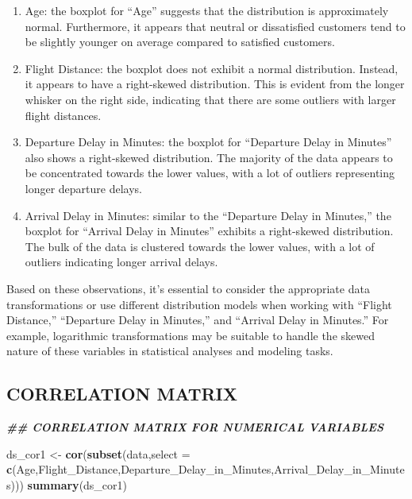 \documentclass[
]{article}
\newenvironment{Shaded}{\begin{snugshade}}{\end{snugshade}}
\newcommand{\AttributeTok}[1]{\textcolor[rgb]{0.13,0.29,0.53}{#1}}
\newcommand{\DocumentationTok}[1]{\textcolor[rgb]{0.56,0.35,0.01}{\textbf{\textit{#1}}}}
\newcommand{\FunctionTok}[1]{\textcolor[rgb]{0.13,0.29,0.53}{\textbf{#1}}}
\newcommand{\NormalTok}[1]{#1}
\newcommand{\OtherTok}[1]{\textcolor[rgb]{0.56,0.35,0.01}{#1}}
\begin{document}
\begin{enumerate}
\def\labelenumi{\arabic{enumi}.}
\item
  Age: the boxplot for ``Age'' suggests that the distribution is
  approximately normal. Furthermore, it appears that neutral or
  dissatisfied customers tend to be slightly younger on average compared
  to satisfied customers.
\item
  Flight Distance: the boxplot does not exhibit a normal distribution.
  Instead, it appears to have a right-skewed distribution. This is
  evident from the longer whisker on the right side, indicating that
  there are some outliers with larger flight distances.
\item
  Departure Delay in Minutes: the boxplot for ``Departure Delay in
  Minutes'' also shows a right-skewed distribution. The majority of the
  data appears to be concentrated towards the lower values, with a lot
  of outliers representing longer departure delays.
\item
  Arrival Delay in Minutes: similar to the ``Departure Delay in
  Minutes,'' the boxplot for ``Arrival Delay in Minutes'' exhibits a
  right-skewed distribution. The bulk of the data is clustered towards
  the lower values, with a lot of outliers indicating longer arrival
  delays.
\end{enumerate}

Based on these observations, it's essential to consider the appropriate
data transformations or use different distribution models when working
with ``Flight Distance,'' ``Departure Delay in Minutes,'' and ``Arrival
Delay in Minutes.'' For example, logarithmic transformations may be
suitable to handle the skewed nature of these variables in statistical
analyses and modeling tasks.

\hypertarget{correlation-matrix}{%
\subsection{CORRELATION MATRIX}\label{correlation-matrix}}

\begin{Shaded}
\begin{Highlighting}[]
\DocumentationTok{\#\# CORRELATION MATRIX FOR NUMERICAL VARIABLES}

\NormalTok{ds\_cor1 }\OtherTok{\textless{}{-}} \FunctionTok{cor}\NormalTok{(}\FunctionTok{subset}\NormalTok{(data,}\AttributeTok{select =} \FunctionTok{c}\NormalTok{(Age,Flight\_Distance,Departure\_Delay\_in\_Minutes,Arrival\_Delay\_in\_Minutes)))}
\FunctionTok{summary}\NormalTok{(ds\_cor1)}
\end{Highlighting}
\end{Shaded}
\end{document}
